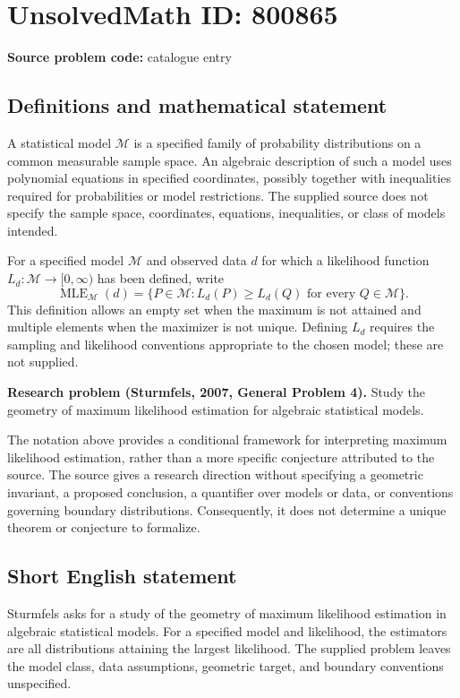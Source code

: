 \documentclass[11pt]{article}
\begin{document}
\section*{UnsolvedMath ID: 800865}
\textbf{Source problem code:} catalogue entry
\subsection{Definitions and mathematical statement}
A statistical model \(\mathcal M\) is a specified family of probability distributions on a common measurable sample space. An algebraic description of such a model uses polynomial equations in specified coordinates, possibly together with inequalities required for probabilities or model restrictions. The supplied source does not specify the sample space, coordinates, equations, inequalities, or class of models intended.

For a specified model \(\mathcal M\) and observed data \(d\) for which a likelihood function \(L_d\colon\mathcal M\to[0,\infty)\) has been defined, write
\[
\operatorname{MLE}_{\mathcal M}(d)
=\bigl\{P\in\mathcal M: L_d(P)\geq L_d(Q)\text{ for every }Q\in\mathcal M\bigr\}.
\]
This definition allows an empty set when the maximum is not attained and multiple elements when the maximizer is not unique. Defining \(L_d\) requires the sampling and likelihood conventions appropriate to the chosen model; these are not supplied.

\textbf{Research problem (Sturmfels, 2007, General Problem 4).} Study the geometry of maximum likelihood estimation for algebraic statistical models.

The notation above provides a conditional framework for interpreting maximum likelihood estimation, rather than a more specific conjecture attributed to the source. The source gives a research direction without specifying a geometric invariant, a proposed conclusion, a quantifier over models or data, or conventions governing boundary distributions. Consequently, it does not determine a unique theorem or conjecture to formalize.
\subsection{Short English statement}
Sturmfels asks for a study of the geometry of maximum likelihood estimation in algebraic statistical models. For a specified model and likelihood, the estimators are all distributions attaining the largest likelihood. The supplied problem leaves the model class, data assumptions, geometric target, and boundary conventions unspecified.
\end{document}

